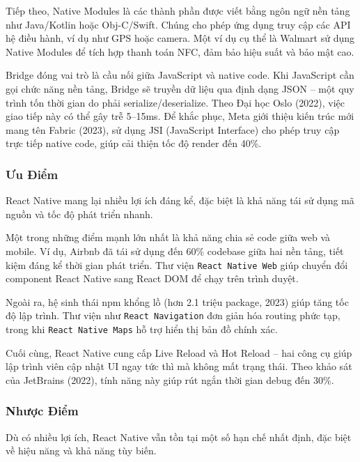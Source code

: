 \begin{sloppypar}
Tiếp theo, Native Modules là các thành phần được viết bằng ngôn ngữ nền tảng như Java/Kotlin hoặc Obj-C/Swift.  
Chúng cho phép ứng dụng truy cập các API hệ điều hành, ví dụ như GPS hoặc camera.  
Một ví dụ cụ thể là Walmart sử dụng Native Modules để tích hợp thanh toán NFC, đảm bảo hiệu suất và bảo mật cao.
\end{sloppypar}

\begin{sloppypar}
Bridge đóng vai trò là cầu nối giữa JavaScript và native code.  
Khi JavaScript cần gọi chức năng nền tảng, Bridge sẽ truyền dữ liệu qua định dạng JSON – một quy trình tốn thời gian do phải serialize/\-deserialize.  
Theo Đại học Oslo (2022), việc giao tiếp này có thể gây trễ 5–15ms.  
Để khắc phục, Meta giới thiệu kiến trúc mới mang tên Fabric (2023), sử dụng JSI (JavaScript\- Interface) cho phép truy cập trực tiếp native code, giúp cải thiện tốc độ render đến 40\%.
\end{sloppypar}

\subsubsection{Ưu Điểm}
React Native mang lại nhiều lợi ích đáng kể, đặc biệt là khả năng tái sử dụng mã nguồn và tốc độ phát triển nhanh.

Một trong những điểm mạnh lớn nhất là khả năng chia sẻ code giữa web và mobile.  
Ví dụ, Airbnb đã tái sử dụng đến 60\% codebase giữa hai nền tảng, tiết kiệm đáng kể thời gian phát triển.  
Thư viện \texttt{React Native Web} giúp chuyển đổi component React Native sang React DOM để chạy trên trình duyệt.

Ngoài ra, hệ sinh thái npm khổng lồ (hơn 2.1 triệu package, 2023) giúp tăng tốc độ lập trình.  
Thư viện như \texttt{React Navigation} đơn giản hóa routing phức tạp, trong khi \texttt{React Native Maps} hỗ trợ hiển thị bản đồ chính xác.

Cuối cùng, React Native cung cấp Live Reload và Hot Reload – hai công cụ giúp lập trình viên cập nhật UI ngay tức thì mà không mất trạng thái.  
Theo khảo sát của JetBrains (2022), tính năng này giúp rút ngắn thời gian debug đến 30\%.

\subsubsection{Nhược Điểm}

Dù có nhiều lợi ích, React Native vẫn tồn tại một số hạn chế nhất định, đặc biệt về hiệu năng và khả năng tùy biến.

